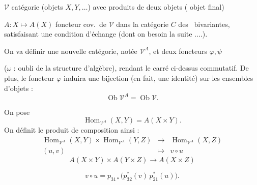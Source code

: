 \documentclass[11pt,a4paper]{article}
\begin{document}

$\mathcal{V}$ catégorie (objets $X, Y, \ldots$) avec produits de deux objets
( objet final)

$A \colon X \mapsto A(X)$ foncteur cov.\ de $\mathcal{V}$ dans la catégorie $C$
des \ bivariantes, satisfaisant une condition d'échange
\struck{\ill{}}  (dont on  besoin
\struck{\ill{}} \ill{} \ill{} la suite ....).


On va définir une nouvelle catégorie, notée $\mathcal{V}^{A}$, et deux
foncteurs $\varphi, \psi$


($\omega$ : oubli de la structure d'algèbre), rendant le carré ci-dessus
commutatif. De plus, le foncteur $\varphi$ induira une bijection (en fait, une
identité) sur les ensembles d'objets \struck{\ill{}} :
\[ \operatorname{Ob} \mathcal{V}^{A} = \operatorname{Ob} \mathcal{V} . \]

On pose
\[ \operatorname{Hom}_{\mathcal{V}^{A}}(X,Y) = A(X \times Y) . \]
On définit le produit de composition ainsi :
\[
\begin{array}{ccc}
\operatorname{Hom}_{\mathcal{V}^{A}}(X,Y) \times \operatorname{Hom}_{\mathcal{V}^{A}}(Y,Z) & \longrightarrow & \operatorname{Hom}_{\mathcal{V}^{A}}(X,Z) \\
(u, v) & \longmapsto & v \circ u
\end{array}
\]
\[ A(X \times Y) \times A(Y \times Z) \longrightarrow A(X \times Z) \]


\[ \boxed{\, v \circ u = p_{31*}\bigl( p_{32}^{*}(v)\, p_{21}^{*}(u) \bigr) . \,} \]
\end{document}
